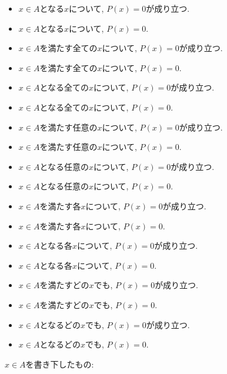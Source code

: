 \documentclass[a4paper,12pt,draft]{amsart}
\begin{document}
\begin{itemize}
\item $x\in A$となる$x$について, $P(x)=0$が成り立つ.
\item $x\in A$となる$x$について, $P(x)=0$.
\item $x\in A$を満たす全ての$x$について, $P(x)=0$が成り立つ.
\item $x\in A$を満たす全ての$x$について, $P(x)=0$.
\item $x\in A$となる全ての$x$について, $P(x)=0$が成り立つ.
\item $x\in A$となる全ての$x$について, $P(x)=0$.
\item $x\in A$を満たす任意の$x$について, $P(x)=0$が成り立つ.
\item $x\in A$を満たす任意の$x$について, $P(x)=0$.
\item $x\in A$となる任意の$x$について, $P(x)=0$が成り立つ.
\item $x\in A$となる任意の$x$について, $P(x)=0$.
\item $x\in A$を満たす各$x$について, $P(x)=0$が成り立つ.
\item $x\in A$を満たす各$x$について, $P(x)=0$.
\item $x\in A$となる各$x$について, $P(x)=0$が成り立つ.
\item $x\in A$となる各$x$について, $P(x)=0$.
\item $x\in A$を満たすどの$x$でも, $P(x)=0$が成り立つ.
\item $x\in A$を満たすどの$x$でも, $P(x)=0$.
\item $x\in A$となるどの$x$でも, $P(x)=0$が成り立つ.
\item $x\in A$となるどの$x$でも, $P(x)=0$.
\end{itemize}
$x\in A$を書き下したもの:
\end{document}
